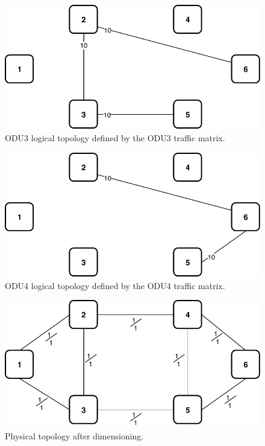 \begin{figure}[h!]
\centering
\includegraphics[width=12cm]{sdf/ilp/translucent_protection/figures/logical_topology_ODU3_medium}
\caption{ODU3 logical topology defined by the ODU3 traffic matrix.}
\label{logical3_ODU3_protectionmedium}
\end{figure}

\begin{figure}[h!]
\centering
\includegraphics[width=12cm]{sdf/ilp/translucent_protection/figures/logical_topology_ODU4_medium}
\caption{ODU4 logical topology defined by the ODU4 traffic matrix.}
\label{logical3_ODU4_protectionmedium}
\end{figure}
\newpage
\begin{figure}[h!]
\centering
\includegraphics[width=12cm]{sdf/ilp/translucent_protection/figures/physical_topology_medium}
\caption{Physical topology after dimensioning.}
\label{physical3_protectionmedium}
\end{figure}

